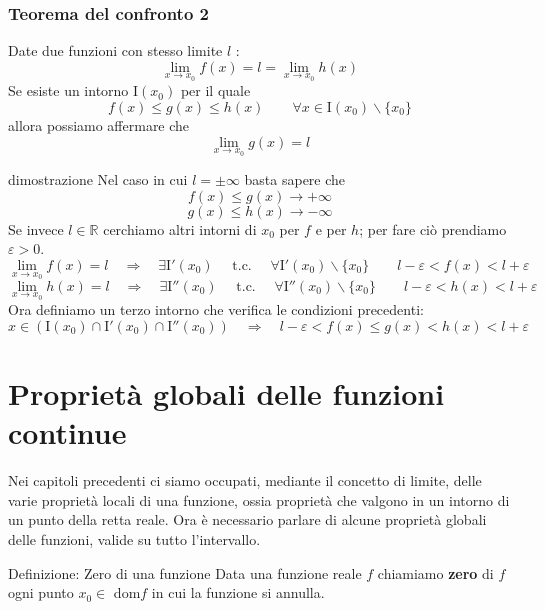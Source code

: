 \documentclass[x11names]{article}
\begin{document}
\begin{center}
\colorbox{myred}{\begin{minipage}{5.75in}
\begin{redes}{}
\subsubsection{Teorema del confronto 2}
Date due funzioni con stesso limite $l$ :
\[
\lim_{x \to x_0} f(x) = l = \lim_{x \to x_0} h(x)
\]
Se esiste un intorno $\text{I}(x_0)$ per il quale 
\[
f(x) \leq g(x) \leq h(x) \qquad  \forall x \in \text{I}(x_0) \backslash \{x_0\}
\]
allora possiamo affermare che 
\[
\lim_{x \to x_0} g(x) = l
\]
\end{redes}
\end{minipage}}        
\end{center}
\begin{es}{dimostrazione}
Nel caso in cui $l = \pm \infty$ basta sapere che
\[
f(x) \leq g(x) \to +\infty
\]
\[
g(x) \leq h(x) \to -\infty
\]
Se invece $l \in \mathbb{R}$ cerchiamo altri intorni di $x_0$ per $f$ e per $h$; per fare ciò prendiamo $\varepsilon > 0$.
\[
\lim_{x \to x_0} f(x) = l \quad \Longrightarrow \quad \exists \text{I}'(x_0) \quad \text{ t.c. } \quad \forall \text{I}'(x_0) \backslash \{x_0\} \qquad l - \varepsilon < f(x) < l + \varepsilon
\]
\[
 \lim_{x \to x_0} h(x) = l \quad \Longrightarrow \quad \exists \text{I}''(x_0) \quad \text{ t.c. } \quad \forall \text{I}''(x_0) \backslash \{x_0\} \qquad l - \varepsilon < h(x) < l + \varepsilon
\]
Ora definiamo un terzo intorno che verifica le condizioni precedenti:
\[
x \in (\text{I}(x_0) \cap \text{I}'(x_0) \cap \text{I}''(x_0)) \quad \Longrightarrow \quad l - \varepsilon < f(x)\leq g(x) < h(x) < l + \varepsilon
\]
\end{es}






\newpage
\section{Proprietà globali delle funzioni continue}
Nei capitoli precedenti ci siamo occupati, mediante il concetto di limite, delle varie proprietà locali di una funzione, ossia proprietà che valgono in un intorno di un punto della retta reale. Ora è necessario parlare di alcune proprietà globali delle funzioni, valide su tutto l'intervallo.

\begin{center}
\colorbox{myblue}{\begin{minipage}{5.75in}
\begin{blues}{Definizione: Zero di una funzione}
Data una funzione reale $f$ chiamiamo \textbf{zero} di $f$ ogni punto $x_0 \in$ dom$f$ in cui la funzione si annulla.
\end{blues}
\end{minipage}}        
\end{center}
\end{document}

